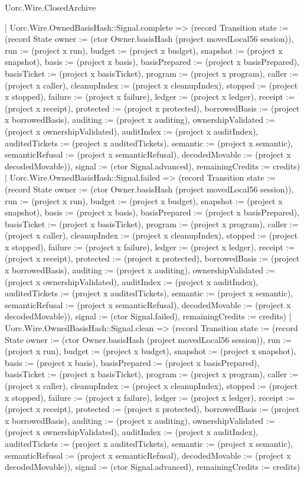 \begin{lexlean}{Uorc.Wire.ClosedArchive}
\begin{semanticmodule}
{      | Uorc.Wire.OwnedBasisHash::Signal.complete => (record Transition {state := (record State {owner := (ctor Owner.basisHash (project movedLocal56 session)), run := (project x run), budget := (project x budget), snapshot := (project x snapshot), basis := (project x basis), basisPrepared := (project x basisPrepared), basisTicket := (project x basisTicket), program := (project x program), caller := (project x caller), cleanupIndex := (project x cleanupIndex), stopped := (project x stopped), failure := (project x failure), ledger := (project x ledger), receipt := (project x receipt), protected := (project x protected), borrowedBasis := (project x borrowedBasis), auditing := (project x auditing), ownershipValidated := (project x ownershipValidated), auditIndex := (project x auditIndex), auditedTickets := (project x auditedTickets), semantic := (project x semantic), semanticRefusal := (project x semanticRefusal), decodedMovable := (project x decodedMovable)}), signal := (ctor Signal.advanced), remainingCredits := credits})
      | Uorc.Wire.OwnedBasisHash::Signal.failed => (record Transition {state := (record State {owner := (ctor Owner.basisHash (project movedLocal56 session)), run := (project x run), budget := (project x budget), snapshot := (project x snapshot), basis := (project x basis), basisPrepared := (project x basisPrepared), basisTicket := (project x basisTicket), program := (project x program), caller := (project x caller), cleanupIndex := (project x cleanupIndex), stopped := (project x stopped), failure := (project x failure), ledger := (project x ledger), receipt := (project x receipt), protected := (project x protected), borrowedBasis := (project x borrowedBasis), auditing := (project x auditing), ownershipValidated := (project x ownershipValidated), auditIndex := (project x auditIndex), auditedTickets := (project x auditedTickets), semantic := (project x semantic), semanticRefusal := (project x semanticRefusal), decodedMovable := (project x decodedMovable)}), signal := (ctor Signal.failed), remainingCredits := credits})
      | Uorc.Wire.OwnedBasisHash::Signal.clean => (record Transition {state := (record State {owner := (ctor Owner.basisHash (project movedLocal56 session)), run := (project x run), budget := (project x budget), snapshot := (project x snapshot), basis := (project x basis), basisPrepared := (project x basisPrepared), basisTicket := (project x basisTicket), program := (project x program), caller := (project x caller), cleanupIndex := (project x cleanupIndex), stopped := (project x stopped), failure := (project x failure), ledger := (project x ledger), receipt := (project x receipt), protected := (project x protected), borrowedBasis := (project x borrowedBasis), auditing := (project x auditing), ownershipValidated := (project x ownershipValidated), auditIndex := (project x auditIndex), auditedTickets := (project x auditedTickets), semantic := (project x semantic), semanticRefusal := (project x semanticRefusal), decodedMovable := (project x decodedMovable)}), signal := (ctor Signal.advanced), remainingCredits := credits})
}
\end{semanticmodule}
\end{lexlean}
